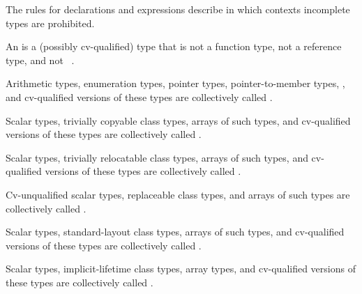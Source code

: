 \pnum
\begin{note}
The rules for declarations and expressions describe in which
contexts incomplete types are prohibited.
\end{note}

\pnum
\label{term.object.type}%
An  is a (possibly cv-qualified) type that is not
a function type, not a reference type, and not \cv{}~.

\pnum
{}%
%
%
\label{term.scalar.type}%
Arithmetic types, enumeration types,
pointer types, pointer-to-member types,
,
and
cv-qualified versions of these
types are collectively called
.

\label{term.trivially.copyable.type}%
Scalar types, trivially copyable class types,
arrays of such types, and cv-qualified versions of these
types are collectively called .

\label{term.trivially.relocatable.type}%
Scalar types, trivially relocatable class types,
arrays of such types, and cv-qualified versions of these
types are collectively called .

\label{term.replaceable.type}%
Cv-unqualified scalar types, replaceable class types, and
arrays of such types are collectively called
.

\label{term.standard.layout.type}%
Scalar types, standard-layout class
types, arrays of such types, and
cv-qualified versions of these types
are collectively called .

\label{term.implicit.lifetime.type}%
Scalar types, implicit-lifetime class types,
array types, and cv-qualified versions of these types
are collectively called .

